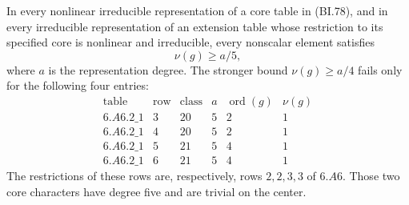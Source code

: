\begin{lemma}
\label{D-BI-21a}
In every nonlinear irreducible representation of a core table in
(BI.78), and in every irreducible representation of an extension
table whose restriction to its specified core is nonlinear and
irreducible, every nonscalar element satisfies
\[
                              \nu(g)\ge a/5,                 \tag{BI.79}
\]
where $a$ is the representation degree.  The stronger bound
$\nu(g)\ge a/4$ fails only for the following four entries:
\[
\begin{array}{c|r|r|r|r|r}
\text{table}&\text{row}&\text{class}&a&\operatorname{ord}(g)&\nu(g)\\\hline
6.A6.2\_1&3&20&5&2&1\\
6.A6.2\_1&4&20&5&2&1\\
6.A6.2\_1&5&21&5&4&1\\
6.A6.2\_1&6&21&5&4&1
\end{array}                                                   \tag{BI.80}
\]
The restrictions of these rows are, respectively, rows
$2,2,3,3$ of $6.A6$.  Those two core characters have degree five
and are trivial on the center.
\end{lemma}

